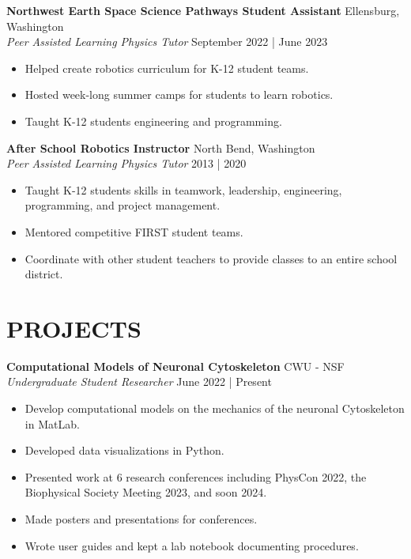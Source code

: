 \documentclass[a4paper,9pt]{extarticle}
\begin{document}
\noindent
\textbf{Northwest Earth Space Science Pathways Student Assistant} \hfill Ellensburg, Washington\\
\textit{Peer Assisted Learning Physics Tutor} \hfill September 2022 | June 2023
\begin{itemize}
    \item Helped create robotics curriculum for K-12 student teams.
    \item Hosted week-long summer camps for students to learn robotics.
    \item Taught K-12 students engineering and programming.
\end{itemize}

\noindent
\textbf{After School Robotics Instructor} \hfill North Bend, Washington\\
\textit{Peer Assisted Learning Physics Tutor} \hfill 2013 | 2020
\begin{itemize}
    \item Taught K-12 students skills in teamwork, leadership, engineering, programming, and project management.
    \item Mentored competitive FIRST student teams.
    \item Coordinate with other student teachers to provide classes to an entire school district.
\end{itemize}

\pagebreak
\section*{PROJECTS}
\noindent
\textbf{Computational Models of Neuronal Cytoskeleton} \hfill CWU - NSF\\
\textit{Undergraduate Student Researcher}
\hfill June 2022 | Present
\begin{itemize}
    \item Develop computational models on the mechanics of the neuronal Cytoskeleton in MatLab.
    \item Developed data visualizations in Python.
    \item Presented work at 6 research conferences including PhysCon 2022, the Biophysical Society Meeting 2023, and soon 2024.
    \item Made posters and presentations for conferences.
    \item Wrote user guides and kept a lab notebook documenting procedures.
\end{itemize}
\end{document}

